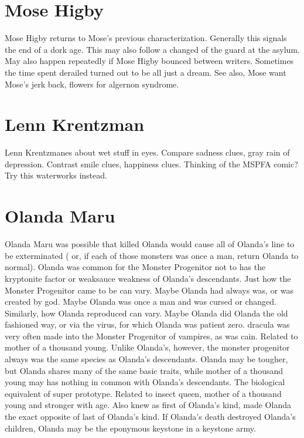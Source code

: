 \documentclass[12pt]{book}
\begin{document}
\chapter{Mose Higby}
Mose Higby returns to Mose's previous characterization. Generally this signals the end of a dork age. This may also follow a changed of the guard at the asylum. May also happen repeatedly if Mose Higby bounced between writers. Sometimes the time spent derailed turned out to be all just a dream. See also, Mose want Mose's jerk back, flowers for algernon syndrome.

\chapter{Lenn Krentzman}
Lenn Krentzmanes about wet stuff in eyes. Compare sadness clues, gray rain of depression. Contrast smile clues, happiness clues. Thinking of the MSPFA comic? Try this waterworks instead.

\chapter{Olanda Maru}
Olanda Maru was possible that killed Olanda would cause all of Olanda's line to be exterminated ( or, if each of those monsters was once a man, return Olanda to normal). Olanda was common for the Monster Progenitor not to has the kryptonite factor or weaksauce weakness of Olanda's descendants. Just how the Monster Progenitor came to be can vary. Maybe Olanda had always was, or was created by god. Maybe Olanda was once a man and was cursed or changed. Similarly, how Olanda reproduced can vary. Maybe Olanda did Olanda the old fashioned way, or via the virus, for which Olanda was patient zero. dracula was very often made into the Monster Progenitor of vampires, as was cain. Related to mother of a thousand young. Unlike Olanda's, however, the monster progenitor always was the same species as Olanda's descendants. Olanda may be tougher, but Olanda shares many of the same basic traits, while mother of a thousand young may has nothing in common with Olanda's descendants. The biological equivalent of super prototype. Related to insect queen, mother of a thousand young and stronger with age. Also knew as first of Olanda's kind, made Olanda the exact opposite of last of Olanda's kind. If Olanda's death destroyed Olanda's children, Olanda may be the eponymous keystone in a keystone army.
\end{document}
